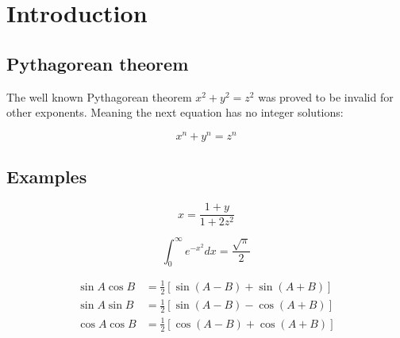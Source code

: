 \documentclass[twocolumn]{article}
\begin{document}
\section{Introduction}

\subsection{ Pythagorean theorem}

The well known Pythagorean theorem \(x^2 + y^2 = z^2\) was 
proved to be invalid for other exponents. 
Meaning the next equation has no integer solutions:
 
$$ x^n + y^n = z^n $$

\subsection{ Examples}

$$x=\frac{1+y}{1+2z^2}$$

$$\int_0^\infty e^{-x^2} dx=\frac{\sqrt{\pi}}{2}$$

\begin{align*}
          \sin A \cos B &= \frac{1}{2}\left[ \sin(A-B)+\sin(A+B) \right] \\
          \sin A \sin B &= \frac{1}{2}\left[ \sin(A-B)-\cos(A+B) \right] \\
          \cos A \cos B &= \frac{1}{2}\left[ \cos(A-B)+\cos(A+B) \right] \\
\end{align*}
\end{document}
